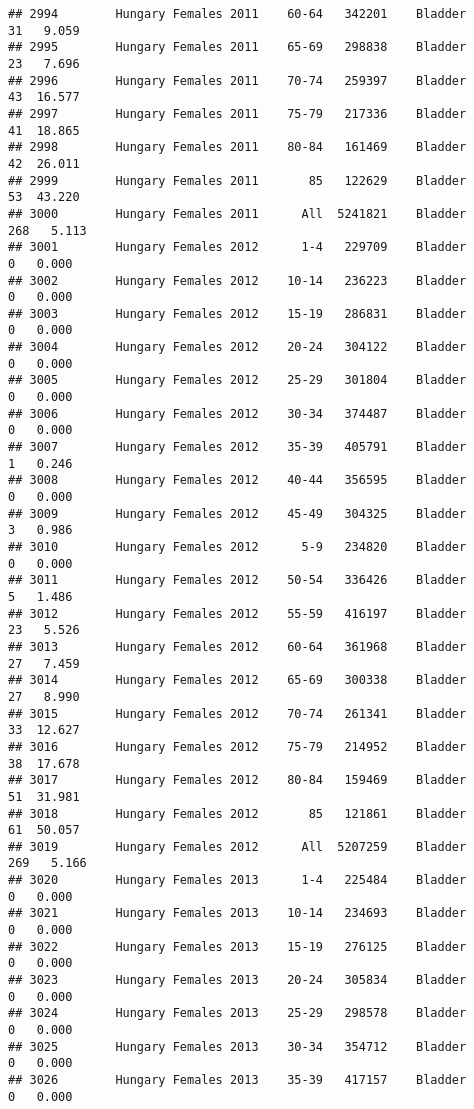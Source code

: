 \documentclass[
]{article}
\begin{document}
\begin{verbatim}
## 2994        Hungary Females 2011    60-64   342201    Bladder     31   9.059
## 2995        Hungary Females 2011    65-69   298838    Bladder     23   7.696
## 2996        Hungary Females 2011    70-74   259397    Bladder     43  16.577
## 2997        Hungary Females 2011    75-79   217336    Bladder     41  18.865
## 2998        Hungary Females 2011    80-84   161469    Bladder     42  26.011
## 2999        Hungary Females 2011       85   122629    Bladder     53  43.220
## 3000        Hungary Females 2011      All  5241821    Bladder    268   5.113
## 3001        Hungary Females 2012      1-4   229709    Bladder      0   0.000
## 3002        Hungary Females 2012    10-14   236223    Bladder      0   0.000
## 3003        Hungary Females 2012    15-19   286831    Bladder      0   0.000
## 3004        Hungary Females 2012    20-24   304122    Bladder      0   0.000
## 3005        Hungary Females 2012    25-29   301804    Bladder      0   0.000
## 3006        Hungary Females 2012    30-34   374487    Bladder      0   0.000
## 3007        Hungary Females 2012    35-39   405791    Bladder      1   0.246
## 3008        Hungary Females 2012    40-44   356595    Bladder      0   0.000
## 3009        Hungary Females 2012    45-49   304325    Bladder      3   0.986
## 3010        Hungary Females 2012      5-9   234820    Bladder      0   0.000
## 3011        Hungary Females 2012    50-54   336426    Bladder      5   1.486
## 3012        Hungary Females 2012    55-59   416197    Bladder     23   5.526
## 3013        Hungary Females 2012    60-64   361968    Bladder     27   7.459
## 3014        Hungary Females 2012    65-69   300338    Bladder     27   8.990
## 3015        Hungary Females 2012    70-74   261341    Bladder     33  12.627
## 3016        Hungary Females 2012    75-79   214952    Bladder     38  17.678
## 3017        Hungary Females 2012    80-84   159469    Bladder     51  31.981
## 3018        Hungary Females 2012       85   121861    Bladder     61  50.057
## 3019        Hungary Females 2012      All  5207259    Bladder    269   5.166
## 3020        Hungary Females 2013      1-4   225484    Bladder      0   0.000
## 3021        Hungary Females 2013    10-14   234693    Bladder      0   0.000
## 3022        Hungary Females 2013    15-19   276125    Bladder      0   0.000
## 3023        Hungary Females 2013    20-24   305834    Bladder      0   0.000
## 3024        Hungary Females 2013    25-29   298578    Bladder      0   0.000
## 3025        Hungary Females 2013    30-34   354712    Bladder      0   0.000
## 3026        Hungary Females 2013    35-39   417157    Bladder      0   0.000

\end{verbatim}
\end{document}
